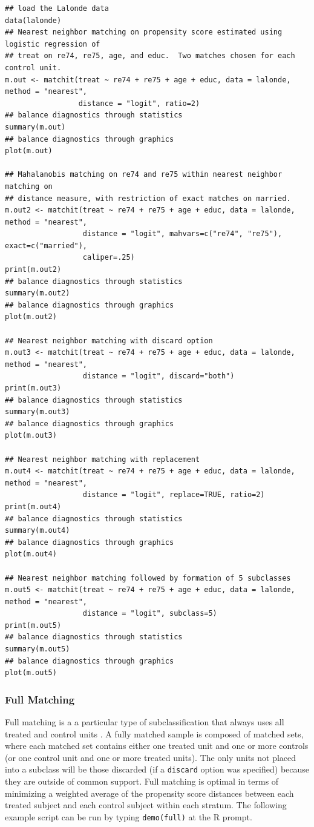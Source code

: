 \documentclass[oneside,letterpaper,titlepage]{article}
\begin{document}
\begin{verbatim}
## load the Lalonde data
data(lalonde)
## Nearest neighbor matching on propensity score estimated using logistic regression of
## treat on re74, re75, age, and educ.  Two matches chosen for each control unit.
m.out <- matchit(treat ~ re74 + re75 + age + educ, data = lalonde, method = "nearest", 
                 distance = "logit", ratio=2)
## balance diagnostics through statistics
summary(m.out)
## balance diagnostics through graphics
plot(m.out)

## Mahalanobis matching on re74 and re75 within nearest neighbor matching on 
## distance measure, with restriction of exact matches on married.
m.out2 <- matchit(treat ~ re74 + re75 + age + educ, data = lalonde, method = "nearest", 
                  distance = "logit", mahvars=c("re74", "re75"), exact=c("married"), 
                  caliper=.25)
print(m.out2)
## balance diagnostics through statistics
summary(m.out2)
## balance diagnostics through graphics
plot(m.out2)

## Nearest neighbor matching with discard option
m.out3 <- matchit(treat ~ re74 + re75 + age + educ, data = lalonde, method = "nearest", 
                  distance = "logit", discard="both")
print(m.out3)
## balance diagnostics through statistics
summary(m.out3)
## balance diagnostics through graphics
plot(m.out3)

## Nearest neighbor matching with replacement
m.out4 <- matchit(treat ~ re74 + re75 + age + educ, data = lalonde, method = "nearest", 
                  distance = "logit", replace=TRUE, ratio=2)
print(m.out4)
## balance diagnostics through statistics
summary(m.out4)
## balance diagnostics through graphics
plot(m.out4)

## Nearest neighbor matching followed by formation of 5 subclasses
m.out5 <- matchit(treat ~ re74 + re75 + age + educ, data = lalonde, method = "nearest", 
                  distance = "logit", subclass=5)
print(m.out5)
## balance diagnostics through statistics
summary(m.out5)
## balance diagnostics through graphics
plot(m.out5)
\end{verbatim}

\subsubsection{Full Matching}
\label{subsubsec:full}

Full matching is a a particular type of subclassification that always
uses all treated and control units \citep{Rosenbaum02, Hansen04}.  A
fully matched sample is composed of matched sets, where each matched
set contains either one treated unit and one or more controls (or one
control unit and one or more treated units).  The only units not
placed into a subclass will be those discarded (if a \texttt{discard}
option was specified) because they are outside of common support.
Full matching is optimal in terms of minimizing a weighted average of
the propensity score distances between each treated subject and each
control subject within each stratum.  The following example script can
be run by typing {\tt demo(full)} at the R prompt.
\end{document}
